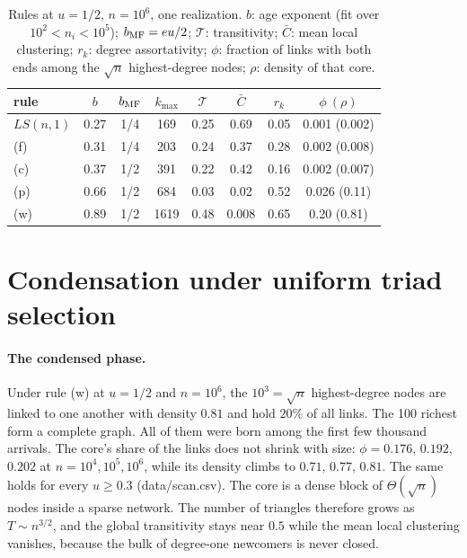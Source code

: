 \documentclass[aps,pre,twocolumn,superscriptaddress,floatfix,nofootinbib]{revtex4-2}
\begin{document}
\begin{table}[b]
\caption{Rules at $u=1/2$, $n=10^6$, one realization. $b$: age exponent
(fit over $10^2<n_i<10^5$); $b_{\rm MF}=eu/2$; $\mathcal T$: transitivity;
$\bar C$: mean local clustering; $r_k$: degree assortativity; $\phi$: fraction of
links with both ends among the $\sqrt n$ highest-degree nodes; $\rho$: density
of that core.}
\label{tab:rules}
\begin{ruledtabular}
\begin{tabular}{lccccccc}
rule & $b$ & $b_{\rm MF}$ & $k_{\max}$ & $\mathcal T$ & $\bar C$ & $r_k$ & $\phi\ (\rho)$\\
\hline
$LS(n,1)$ & 0.27 & 1/4 & 169 & 0.25 & 0.69 & 0.05 & 0.001 (0.002)\\
(f) & 0.31 & 1/4 & 203 & 0.24 & 0.37 & 0.28 & 0.002 (0.008)\\
(c) & 0.37 & 1/2 & 391 & 0.22 & 0.42 & 0.16 & 0.002 (0.007)\\
(p) & 0.66 & 1/2 & 684 & 0.03 & 0.02 & 0.52 & 0.026 (0.11)\\
(w) & 0.89 & 1/2 & 1619 & 0.48 & 0.008 & 0.65 & 0.20 (0.81)\\
\end{tabular}
\end{ruledtabular}
\end{table}

\section{Condensation under uniform triad selection}
\label{sec:condensation}

\paragraph*{The condensed phase.}
Under rule (w) at $u=1/2$ and $n=10^6$, the $10^3=\sqrt n$ highest-degree nodes
are linked to one another with density $0.81$ and hold $20\%$ of all links.
The 100 richest form a complete graph. All of them were born among the first
few thousand arrivals. The core's share of the links does not shrink with
size: $\phi=0.176$, $0.192$, $0.202$ at $n=10^4,10^5,10^6$, while its density
climbs to $0.71$, $0.77$, $0.81$. The same holds for every $u\ge0.3$
(data/scan.csv). The core is a dense block of $\Theta(\sqrt n)$ nodes inside a
sparse network. The number of triangles therefore grows as $T\sim n^{3/2}$, and
the global transitivity stays near $0.5$ while the mean local clustering
vanishes, because the bulk of degree-one newcomers is never closed.
\end{document}
